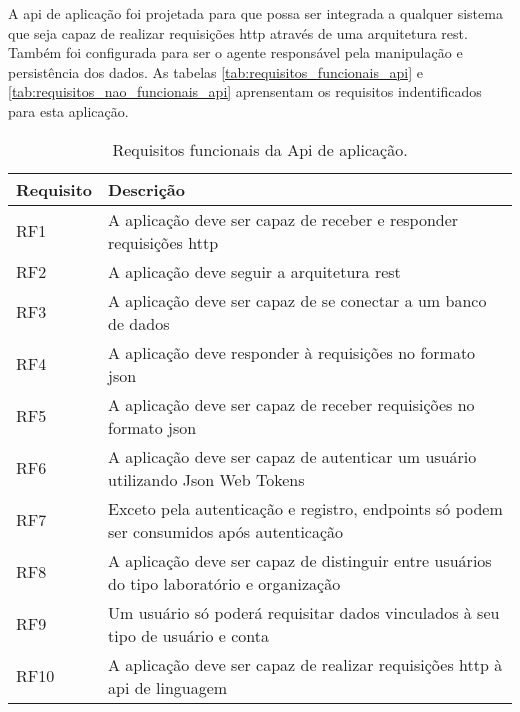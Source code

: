 A \gls{api} de aplicação foi projetada para que possa ser integrada a qualquer sistema que seja capaz de realizar requisições \gls{http} através de uma arquitetura \gls{rest}. Também foi configurada para ser o agente responsável pela manipulação e persistência dos dados. As tabelas \autoref{tab:requisitos_funcionais_api} e \autoref{tab:requisitos_nao_funcionais_api} aprensentam os requisitos indentificados para esta aplicação.

\begin{table}[H]
  \caption{Requisitos funcionais da Api de aplicação.}
  \label{tab:requisitos_funcionais_api}
  \begin{tabularx}{\textwidth}{l|l}
    \hline
    \textbf{Requisito} & \textbf{Descrição}                                                                        \\ \hline
    RF1                & A aplicação deve ser capaz de receber e responder requisições \gls{http}                  \\
    RF2                & A aplicação deve seguir a arquitetura \gls{rest}                                          \\
    RF3                & A aplicação deve ser capaz de se conectar a um banco de dados                             \\
    RF4                & A aplicação deve responder à requisições no formato \gls{json}                            \\
    RF5                & A aplicação deve ser capaz de receber requisições no formato \gls{json}                   \\
    RF6                & A aplicação deve ser capaz de autenticar um usuário utilizando Json Web Tokens            \\
    RF7                & Exceto pela autenticação e registro, endpoints só podem ser consumidos após autenticação  \\
    RF8                & A aplicação deve ser capaz de distinguir entre usuários do tipo laboratório e organização \\
    RF9                & Um usuário só poderá requisitar dados vinculados à seu tipo de usuário e conta            \\
    RF10               & A aplicação deve ser capaz de realizar requisições \gls{http} à \gls{api} de linguagem    \\ \hline
  \end{tabularx}
  \fonte{}
\end{table}

